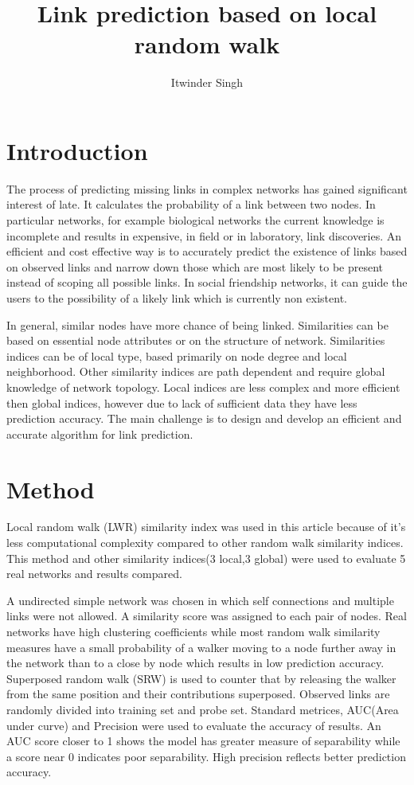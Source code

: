 \documentclass{article}
\title{Link prediction based on local random walk}
\author{Itwinder Singh}
\date{}
\begin{document}
\maketitle
        
\section{Introduction}
The process of predicting missing links in complex networks has gained significant interest of late. It calculates the probability of a link between two nodes. In particular networks, for example biological networks the current knowledge is incomplete and results in expensive, in field or in laboratory, link discoveries. An efficient and cost effective way is to accurately predict the existence of links based on observed links and narrow down those which are most likely to be present instead of scoping all possible links. In social friendship networks, it can guide the users to the possibility of a likely link which is currently non existent.\par
In general, similar nodes have more chance of being linked. Similarities can be based on essential node attributes or on the structure of network. Similarities indices can be of local type, based primarily on node degree and local neighborhood. Other similarity indices are path dependent and require global knowledge of network topology. Local indices are less complex and more efficient then global indices, however due to lack of sufficient data they have less prediction accuracy. The main challenge is to design and develop an efficient and accurate algorithm for link prediction.\par
\section{Method}
Local random walk (LWR) similarity index was used in this article because of it's less computational complexity compared to other random walk similarity indices. This method and other similarity indices(3 local,3 global) were used to evaluate 5 real networks and results compared.\par
A undirected simple network was chosen in which self connections and multiple links were not allowed. A similarity score was assigned to each pair of nodes. Real networks have high clustering coefficients while most random walk similarity measures have a small probability of a walker moving to a node further away in the network than to a close by node which results in low prediction accuracy. Superposed random walk (SRW) is used to counter that by releasing the walker from the same position and their contributions superposed. Observed links are randomly divided into training set and probe set. Standard metrices, AUC(Area under curve) and Precision were used to evaluate the accuracy of results. An AUC score closer to 1 shows the model has greater measure of separability while a score near 0 indicates poor separability. High precision reflects better prediction accuracy.\par 
\end{document}
